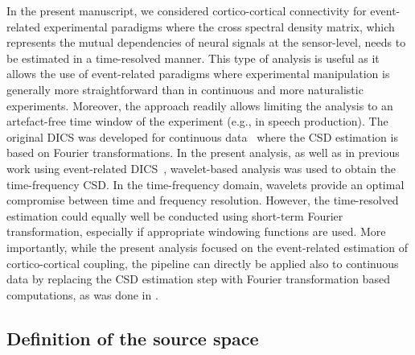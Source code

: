 \documentclass[utf8]{frontiersSCNS}
\renewcommand{\cite}[1]{~\citep{#1}}
\newcommand{\textcite}[1]{\citet{#1}}
\begin{document}
In the present manuscript, we considered cortico-cortical connectivity for event-related experimental paradigms where the cross spectral density matrix, which represents the mutual dependencies of neural signals at the sensor-level, needs to be estimated in a time-resolved manner.
This type of analysis is useful as it allows the use of event-related paradigms where experimental manipulation is generally more straightforward than in continuous and more naturalistic experiments.
Moreover, the approach readily allows limiting the analysis to an artefact-free time window of the experiment (e.g., in speech production).
The original DICS was developed for continuous data\cite{Gross2001} where the CSD estimation is based on Fourier transformations.
In the present analysis, as well as in previous work using event-related DICS\cite{Kujala2012, Kujala2014, Liljestrom2015a}, wavelet-based analysis was used to obtain the time-frequency CSD\@.
In the time-frequency domain, wavelets provide an optimal compromise between time and frequency resolution.
However, the time-resolved estimation could equally well be conducted using short-term Fourier transformation, especially if appropriate windowing functions are used.
More importantly, while the present analysis focused on the event-related estimation of cortico-cortical coupling, the pipeline can directly be applied also to continuous data by replacing the CSD estimation step with Fourier transformation based computations, as was done in \textcite{Gross2001}.

\subsection{Definition of the source space}
\end{document}
